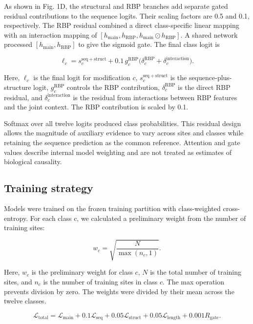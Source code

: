 \documentclass[unnumsec,webpdf,contemporary,large]{oup-authoring-template}
\begin{document}
As shown in Fig. 1D, the structural and RBP branches add separate gated residual contributions to the sequence logits. Their scaling factors are 0.5 and 0.1, respectively. The RBP residual combined a direct class-specific linear mapping with an interaction mapping of $[h_{\mathrm{main}},h_{\mathrm{RBP}},h_{\mathrm{main}}\odot h_{\mathrm{RBP}}]$. A shared network processed $[h_{\mathrm{main}},h_{\mathrm{RBP}}]$ to give the sigmoid gate. The final class logit is

\begin{equation}
\ell_c = s^{\mathrm{seq+struct}}_c + 0.1\,g^{\mathrm{RBP}}_c\bigl(\delta^{\mathrm{RBP}}_c+\delta^{\mathrm{interaction}}_c\bigr).
\end{equation}

Here, $\ell_c$ is the final logit for modification $c$, $s^{\mathrm{seq+struct}}_c$ is the sequence-plus-structure logit, $g^{\mathrm{RBP}}_c$ controls the RBP contribution, $\delta^{\mathrm{RBP}}_c$ is the direct RBP residual, and $\delta^{\mathrm{interaction}}_c$ is the residual from interactions between RBP features and the joint context. The RBP contribution is scaled by 0.1.

Softmax over all twelve logits produced class probabilities. This residual design allows the magnitude of auxiliary evidence to vary across sites and classes while retaining the sequence prediction as the common reference. Attention and gate values describe internal model weighting and are not treated as estimates of biological causality.

\subsection{Training strategy}

Models were trained on the frozen training partition with class-weighted cross-entropy. For each class c, we calculated a preliminary weight from the number of training sites:

\begin{equation}
w_c = \sqrt{\frac{N}{\max(n_c,1)}}.
\end{equation}

Here, $w_c$ is the preliminary weight for class $c$, $N$ is the total number of training sites, and $n_c$ is the number of training sites in class $c$. The max operation prevents division by zero. The weights were divided by their mean across the twelve classes.

\begin{equation}
\mathcal{L}_{\mathrm{total}}=\mathcal{L}_{\mathrm{main}}+0.1\mathcal{L}_{\mathrm{seq}}+0.05\mathcal{L}_{\mathrm{struct}}+0.05\mathcal{L}_{\mathrm{length}}+0.001R_{\mathrm{gate}}.
\end{equation}
\end{document}
